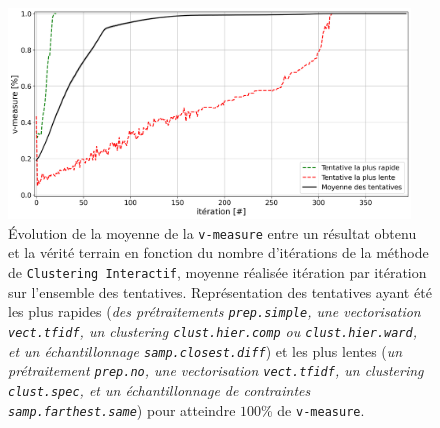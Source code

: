 			\begin{figure}[!htb]
				\centering
				\includegraphics[width=0.95\textwidth]{figures/etude-efficacite-evolution-moyenne-0par-iteration}
				\caption{
					Évolution de la moyenne de la \texttt{v-measure} entre un résultat obtenu et la vérité terrain en fonction du nombre d'itérations de la méthode de \texttt{Clustering Interactif}, moyenne réalisée itération par itération sur l'ensemble des tentatives.
					Représentation des tentatives ayant été les plus rapides (\textit{des prétraitements \texttt{prep.simple}, une vectorisation \texttt{vect.tfidf}, un \textit{clustering} \texttt{clust.hier.comp} ou \texttt{clust.hier.ward}, et un échantillonnage \texttt{samp.closest.diff}}) et les plus lentes (\textit{un prétraitement \texttt{prep.no}, une vectorisation \texttt{vect.tfidf}, un \textit{clustering} \texttt{clust.spec}, et un échantillonnage de contraintes \texttt{samp.farthest.same}}) pour atteindre $100$\% de \texttt{v-measure}.
				}
				\label{figure:4.1.1-ETUDE-CONVERGENCE-EVOLUTION}
			\end{figure}
